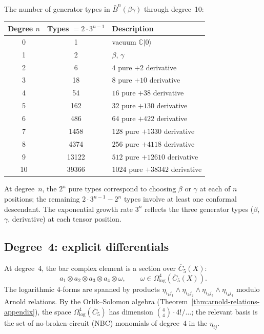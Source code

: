 \begin{computation}
\label{comp:betagamma-dim-table}
The number of generator types in $\bar{B}^n(\beta\gamma)$ through degree~10:
\begin{center}
\begin{tabular}{ccl}
\toprule
Degree $n$ & Types $= 2 \cdot 3^{n-1}$ & Description \\
\midrule
0 & 1 & vacuum $\mathbb{C}|0\rangle$ \\
1 & 2 & $\beta$, $\gamma$ \\
2 & 6 & $4$ pure $+ 2$ derivative \\
3 & 18 & $8$ pure $+ 10$ derivative \\
4 & 54 & $16$ pure $+ 38$ derivative \\
5 & 162 & $32$ pure $+ 130$ derivative \\
6 & 486 & $64$ pure $+ 422$ derivative \\
7 & 1458 & $128$ pure $+ 1330$ derivative \\
8 & 4374 & $256$ pure $+ 4118$ derivative \\
9 & 13122 & $512$ pure $+ 12610$ derivative \\
10 & 39366 & $1024$ pure $+ 38342$ derivative \\
\bottomrule
\end{tabular}
\end{center}
At degree~$n$, the $2^n$ pure types correspond to choosing $\beta$ or
$\gamma$ at each of $n$ positions; the remaining $2 \cdot 3^{n-1} - 2^n$
types involve at least one conformal descendant. The exponential growth
rate $3^n$ reflects the three generator types ($\beta$, $\gamma$, derivative)
at each tensor position.
\end{computation}

\subsection{Degree~4: explicit differentials}

At degree~4, the bar complex element is a section over $\overline{C}_5(X)$:
\[
a_1 \otimes a_2 \otimes a_3 \otimes a_4 \otimes \omega,
\qquad \omega \in \Omega^4_{\log}(\overline{C}_5(X)).
\]
The logarithmic $4$-forms are spanned by products
$\eta_{i_1 j_1} \wedge \eta_{i_2 j_2} \wedge \eta_{i_3 j_3} \wedge \eta_{i_4 j_4}$
modulo Arnold relations. By the Orlik--Solomon algebra
(Theorem~\ref{thm:arnold-relations-appendix}), the space
$\Omega^4_{\log}(\overline{C}_5)$ has dimension
$\binom{4}{4} \cdot 4! / \ldots$; the relevant basis is the set of
no-broken-circuit (NBC) monomials of degree~4 in the $\eta_{ij}$.

